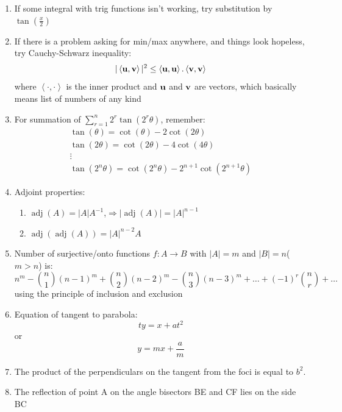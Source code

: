 \documentclass{article}
\numberwithin{equation}{section}
\numberwithin{figure}{section}
\DeclareMathOperator{\adj}{adj}
\newcommand{\Det}[1]{\left|#1\right|}
\begin{document}
\begin{enumerate}
		\item If some integral with trig functions isn't working, try substitution by $\tan(\frac{x}{2})$

		\item If there is a problem asking for min/max anywhere, and things look hopeless, try Cauchy-Schwarz inequality:
			\begin{equation}
				|\left<\bf{u},\bf{v}\right>|^2\leq \left<\bf{u},\bf{u}\right>.\left<\bf{v},\bf{v}\right>
			\end{equation}
		where $\left<\cdot, \cdot \right>$ is the inner product and $\bf{u}$ and $\bf{v}$ are vectors, which basically means list of numbers of any kind
		\item For summation of $\sum_{r=1}^n 2^r \tan(2^{r}\theta)$, remember:
			\begin{align}
				\tan(\theta)=\cot(\theta)-2\cot(2\theta)\\
				\tan(2\theta)=\cot(2\theta)-4\cot(4\theta)\\
				\vdots\\
				\tan(2^n\theta)=\cot(2^n\theta)-2^{n+1}\cot(2^{n+1}\theta)
			\end{align}
		\item Adjoint properties:
			\begin{enumerate}
				\item $\adj(A)=\Det{A}A^{-1}$,$\Rightarrow \Det{\adj(A)}=\Det{A}^{n-1}$
				\item $\adj(\adj(A))=\Det{A}^{n-2} A$
			\end{enumerate}
		\item Number of surjective/onto functions $f:A\rightarrow B$ with $\Det{A}=m$ and $\Det{B}=n$($m>n$) is:
			\begin{equation}
				n^m-{n \choose 1}{(n-1)^m}+{n \choose 2}{(n-2)^m}-{n \choose 3}{(n-3)^m}+\dots+(-1)^r{n \choose r}+\dots
			\end{equation}
			using the principle of inclusion and exclusion
		\item Equation of tangent to parabola:
			\begin{equation}
				ty=x+at^2
			\end{equation}
			or 
			\begin{equation}
				y=mx+\frac{a}{m}
			\end{equation}
		\item The product of the perpendiculars on the tangent from the foci is equal to $b^2$.
		\item The reflection of point A on the angle bisectors BE and CF lies on the side BC

\end{enumerate}
\end{document}

